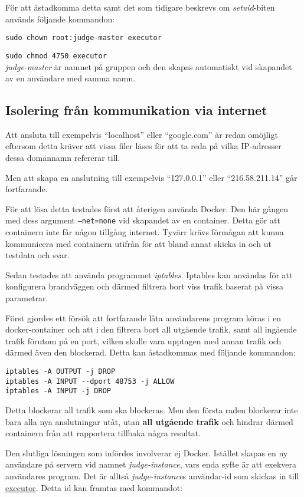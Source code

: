\documentclass{article}
\begin{document}
För att åstadkomma detta samt det som tidigare beskrevs om \textit{setuid}-biten
används följande kommandon:

\texttt{sudo chown root:judge-master executor}

\texttt{sudo chmod 4750 executor}
\\
\textit{judge-master} är namnet på gruppen och den skapas automatiskt vid
skapandet av en användare med samma namn.

\subsection{Isolering från kommunikation via internet}

Att ansluta till exempelvis ``localhost'' eller ``google.com'' är redan omöjligt
eftersom detta kräver att vissa filer läses för att ta reda på vilka IP-adresser
dessa domännamn refererar till.

Men att skapa en anslutning till exempelvis ``127.0.0.1'' eller
``216.58.211.14'' går fortfarande.

För att lösa detta testades först att återigen använda Docker. Den här gången
med dess argument \texttt{--net=none} vid skapandet av en container. Detta gör
att containern inte får någon tillgång internet. Tyvärr krävs förmågan att kunna
kommunicera med containern utifrån för att bland annat skicka in och ut testdata
och svar.

Sedan testades att använda programmet \textit{iptables}. Iptables kan användas
för att konfigurera brandväggen och därmed filtrera bort viss trafik baserat på
vissa parametrar.

Först gjordes ett försök att fortfarande låta användarens program köras i en
docker-container och att i den filtrera bort all utgående trafik, samt all
ingående trafik förutom på en port, vilken skulle vara upptagen med annan
trafik och därmed även den blockerad. Detta kan åstadkommas med följande
kommandon:

\begin{verbatim}
iptables -A OUTPUT -j DROP
iptables -A INPUT --dport 48753 -j ALLOW
iptables -A INPUT -j DROP
\end{verbatim}

Detta blockerar all trafik som ska blockeras. Men den första raden blockerar
inte bara alla nya anslutningar utåt, utan \textbf{all utgående trafik} och
hindrar därmed containern från att rapportera tillbaka några resultat.

Den slutliga lösningen som infördes involverar ej Docker. Istället skapas
en ny användare på servern vid namnet \textit{judge-instance}, vars enda
syfte är att exekvera användares program. Det är alltså \textit{judge-instance}s
användar-id som skickas in till \hyperlink{executor}{executor}.
Detta id kan framtas med kommandot:
\end{document}
